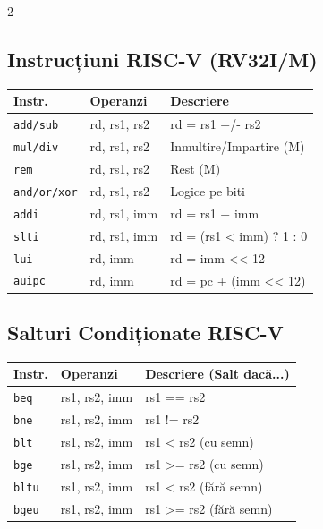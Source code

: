 \documentclass[a4paper]{article}
\begin{document}
\begin{multicols}{2}
\subsection{Instrucțiuni RISC-V (RV32I/M)}
\tiny
\begin{tabular}{p{1.2cm} p{1.8cm} p{4.6cm}}
\toprule
\textbf{Instr.} & \textbf{Operanzi} & \textbf{Descriere} \\
\midrule
\texttt{add/sub} & rd, rs1, rs2 & rd = rs1 +/- rs2 \\
\texttt{mul/div} & rd, rs1, rs2 & Inmultire/Impartire (M) \\
\texttt{rem} & rd, rs1, rs2 & Rest (M) \\
\texttt{and/or/xor} & rd, rs1, rs2 & Logice pe biti \\
\texttt{addi} & rd, rs1, imm & rd = rs1 + imm \\
\texttt{slti} & rd, rs1, imm & rd = (rs1 < imm) ? 1 : 0 \\
\texttt{lui} & rd, imm & rd = imm << 12 \\
\texttt{auipc} & rd, imm & rd = pc + (imm << 12) \\
\bottomrule
\end{tabular}

\subsection{Salturi Condiționate RISC-V}
\tiny
\begin{tabular}{p{1.2cm} p{1.8cm} p{4.6cm}}
\toprule
\textbf{Instr.} & \textbf{Operanzi} & \textbf{Descriere (Salt dacă...)} \\
\midrule
\texttt{beq} & rs1, rs2, imm & rs1 == rs2 \\
\texttt{bne} & rs1, rs2, imm & rs1 != rs2 \\
\texttt{blt} & rs1, rs2, imm & rs1 < rs2 (cu semn) \\
\texttt{bge} & rs1, rs2, imm & rs1 >= rs2 (cu semn) \\
\texttt{bltu} & rs1, rs2, imm & rs1 < rs2 (fără semn) \\
\texttt{bgeu} & rs1, rs2, imm & rs1 >= rs2 (fără semn) \\
\bottomrule
\end{tabular}


\end{multicols}
\end{document}
